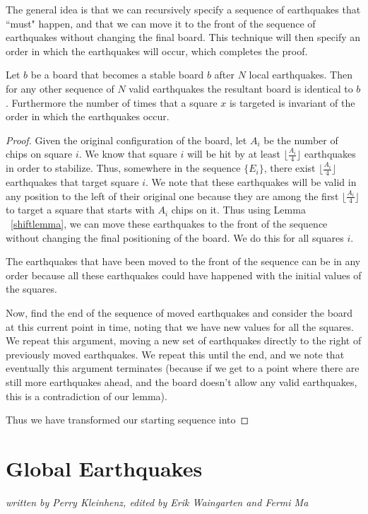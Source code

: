 \documentclass[runningheads,a4paper]{llncs}
\begin{document}
The general idea is that we can recursively specify a sequence of earthquakes that ``must" happen, and that we can move it to the front of the sequence of earthquakes without changing the final board. This technique will then specify an order in which the earthquakes will occur, which completes the proof.

\begin{theorem}
Let $b$ be a board that becomes a stable board $b$ after $N$ local earthquakes. Then for any other sequence of $N$ valid earthquakes the resultant board is identical to $b$. Furthermore the number of times that a square $x$ is targeted is invariant of the order in which the earthquakes occur. 
\end{theorem}
\begin{proof}
Given the original configuration of the board, let $A_i$ be the number of chips on square $i$. We know that square $i$ will be hit by at least $\lfloor \frac{A_i}{4} \rfloor$ earthquakes in order to stabilize. Thus, somewhere in the sequence $\{E_i\}$, there exist $\lfloor \frac{A_i}{4} \rfloor$ earthquakes that target  square $i$. We note that these earthquakes will be valid in any position to the left of their original one because they are among the first $\lfloor \frac{A_i}{4} \rfloor$ to target a square that starts with $A_i$ chips on it. Thus using Lemma ~\ref{shiftlemma}, we can move these earthquakes to the front of the sequence without changing the final positioning of the board. We do this for all squares $i$. 

The earthquakes that have been moved to the front of the sequence can be in any order because all these earthquakes could have happened with the initial values of the squares. 

Now, find the end of the sequence of moved earthquakes and consider the board at this current point in time, noting that we have new values for all the squares. We repeat this argument, moving a new set of earthquakes directly to the right of previously moved earthquakes. We repeat this until the end, and we note that eventually this argument terminates (because if we get to a point where there are still more earthquakes ahead, and the board doesn't allow any valid earthquakes, this is a contradiction of our lemma).

Thus we have transformed our starting sequence into 

\end{proof}

\section{Global Earthquakes}
\label{Global Earthquakes}
\emph{written by Perry Kleinhenz, edited by Erik Waingarten and Fermi Ma}
\end{document}
